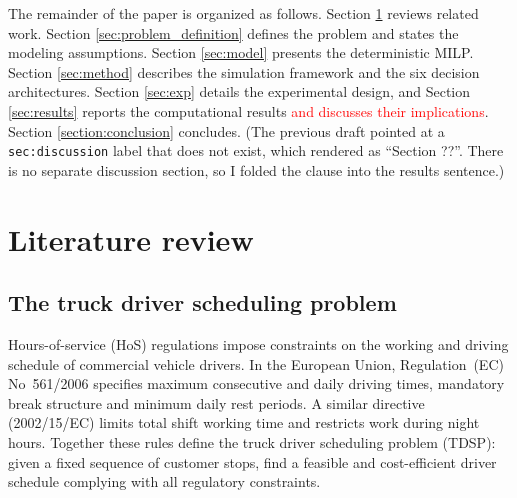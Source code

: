 \documentclass[preprint,12pt,3p]{elsarticle}
\newcommand{\red}[1]{\textcolor{red}{#1}}
\newcommand{\green}[1]{{\color{darkgreen}#1}}
\begin{document}
The remainder of the paper is organized as follows. Section \ref{sec:litreview} reviews related work. Section \ref{sec:problem_definition} defines the problem and states the modeling assumptions. Section \ref{sec:model} presents the deterministic MILP. Section \ref{sec:method} describes the simulation framework and the {six} decision architectures. Section \ref{sec:exp} details the experimental design, and Section \ref{sec:results} reports the computational results \red{and discusses their implications}. Section \ref{section:conclusion} concludes.
\green{(The previous draft pointed at a \texttt{sec:discussion} label that does not exist, which rendered as ``Section ??''. There is no separate discussion section, so I folded the clause into the results sentence.)}





\section{Literature review} \label{sec:litreview}
\subsection{The truck driver scheduling problem}
Hours-of-service (HoS) regulations impose constraints on the working and driving schedule of commercial vehicle drivers. In the European Union, Regulation~(EC) No~561/2006 \citep{noauthor_regulation_2006} specifies maximum consecutive and daily driving times, mandatory break structure and minimum daily rest periods. A similar directive (2002/15/EC) limits total shift working time and restricts work during night hours. Together these rules define the truck driver scheduling problem (TDSP): given a fixed sequence of customer stops, find a feasible and cost-efficient driver schedule complying with all regulatory constraints.
\end{document}
